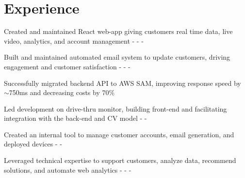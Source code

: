 \documentclass[]{plushcv}
\begin{document}
%
%



%
%

\begin{minipage}[t]{0.70\textwidth} 



\section{Experience}
\vspace{\topsep} %
\begin{tightemize}
\sectionsep
\item Created and maintained React web-app giving customers real time data, live video, analytics, and account management \react - \python - \firebase - \postgresql \\
\item Built and maintained automated email system to update customers, driving engagement and customer satisfaction \react - \python - \firebase - \postgresql \\
\item Successfully migrated backend API to AWS SAM, improving response speed by $\sim$750ms and decreasing costs by 70\% \aws \\
\item Led development on drive-thru monitor, building front-end and facilitating integration with the back-end and CV model \react - \python - \docker \\
\item Created an internal tool to manage customer accounts, email generation, and deployed devices \react - \python - \firebase \\
\item Leveraged technical expertise to support customers, analyze data, recommend solutions, and automate web analytics \react - \dthree - \postgresql - \python \\
\end{tightemize}
\sectionsep


\end{minipage}
\end{document}
